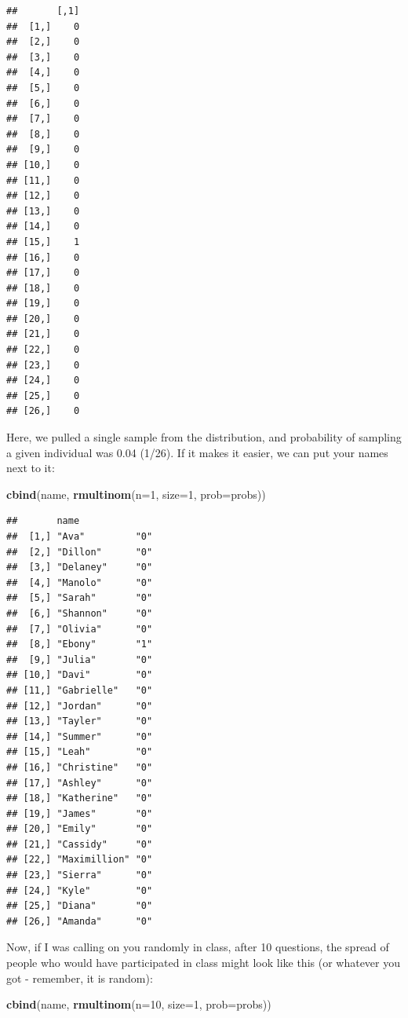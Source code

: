 \documentclass[
]{book}
\newenvironment{Shaded}{\begin{snugshade}}{\end{snugshade}}
\newcommand{\DataTypeTok}[1]{\textcolor[rgb]{0.13,0.29,0.53}{#1}}
\newcommand{\DecValTok}[1]{\textcolor[rgb]{0.00,0.00,0.81}{#1}}
\newcommand{\KeywordTok}[1]{\textcolor[rgb]{0.13,0.29,0.53}{\textbf{#1}}}
\newcommand{\NormalTok}[1]{#1}
\begin{document}
\begin{verbatim}
##       [,1]
##  [1,]    0
##  [2,]    0
##  [3,]    0
##  [4,]    0
##  [5,]    0
##  [6,]    0
##  [7,]    0
##  [8,]    0
##  [9,]    0
## [10,]    0
## [11,]    0
## [12,]    0
## [13,]    0
## [14,]    0
## [15,]    1
## [16,]    0
## [17,]    0
## [18,]    0
## [19,]    0
## [20,]    0
## [21,]    0
## [22,]    0
## [23,]    0
## [24,]    0
## [25,]    0
## [26,]    0
\end{verbatim}

Here, we pulled a single sample from the distribution, and probability of sampling a given individual was 0.04 (1/26). If it makes it easier, we can put your names next to it:

\begin{Shaded}
\begin{Highlighting}[]
\KeywordTok{cbind}\NormalTok{(name, }\KeywordTok{rmultinom}\NormalTok{(}\DataTypeTok{n=}\DecValTok{1}\NormalTok{, }\DataTypeTok{size=}\DecValTok{1}\NormalTok{, }\DataTypeTok{prob=}\NormalTok{probs))}
\end{Highlighting}
\end{Shaded}

\begin{verbatim}
##       name             
##  [1,] "Ava"         "0"
##  [2,] "Dillon"      "0"
##  [3,] "Delaney"     "0"
##  [4,] "Manolo"      "0"
##  [5,] "Sarah"       "0"
##  [6,] "Shannon"     "0"
##  [7,] "Olivia"      "0"
##  [8,] "Ebony"       "1"
##  [9,] "Julia"       "0"
## [10,] "Davi"        "0"
## [11,] "Gabrielle"   "0"
## [12,] "Jordan"      "0"
## [13,] "Tayler"      "0"
## [14,] "Summer"      "0"
## [15,] "Leah"        "0"
## [16,] "Christine"   "0"
## [17,] "Ashley"      "0"
## [18,] "Katherine"   "0"
## [19,] "James"       "0"
## [20,] "Emily"       "0"
## [21,] "Cassidy"     "0"
## [22,] "Maximillion" "0"
## [23,] "Sierra"      "0"
## [24,] "Kyle"        "0"
## [25,] "Diana"       "0"
## [26,] "Amanda"      "0"
\end{verbatim}

Now, if I was calling on you randomly in class, after 10 questions, the spread of people who would have participated in class might look like this (or whatever you got - remember, it is random):

\begin{Shaded}
\begin{Highlighting}[]
\KeywordTok{cbind}\NormalTok{(name, }\KeywordTok{rmultinom}\NormalTok{(}\DataTypeTok{n=}\DecValTok{10}\NormalTok{, }\DataTypeTok{size=}\DecValTok{1}\NormalTok{, }\DataTypeTok{prob=}\NormalTok{probs))}
\end{Highlighting}
\end{Shaded}
\end{document}
